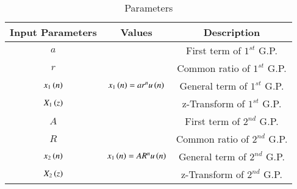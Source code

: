 \begin{table}[htbp]
    \centering
    \begin{tabular}{|c|c|c|} \hline
      \textbf{Input Parameters} & \textbf{Values} & \textbf{Description} \\ \hline
      $a$ & & First term of $1^{st}$ G.P. \\ \hline
      $r$ & & Common ratio of $1^{st}$ G.P. \\ \hline
      $x_1\left(n\right)$ & $x_1\left(n\right)=ar^nu\left(n\right)$& General term of $1^{st}$ G.P. \\ \hline
      $X_1\left(z\right)$ & & z-Transform of $1^{st}$ G.P. \\ \hline
      $A$ & & First term of $2^{nd}$ G.P. \\ \hline
      $R$ & & Common ratio of $2^{nd}$ G.P. \\ \hline
      $x_2\left(n\right)$ & $x_1\left(n\right)=AR^nu\left(n\right)$& General term of $2^{nd}$ G.P. \\ \hline
      $X_2\left(z\right)$ & & z-Transform of $2^{nd}$ G.P. \\ \hline
    \end{tabular}
    \vspace{3pt}
    \caption{Parameters}
    \label{tab:11.9.3.20.tab}
\end{table}
